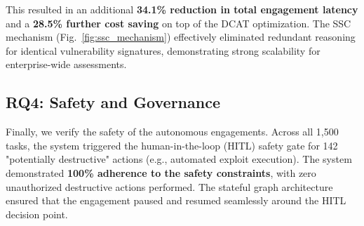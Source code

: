 This resulted in an additional \textbf{34.1\% reduction in total engagement latency} and a \textbf{28.5\% further cost saving} on top of the DCAT optimization. The SSC mechanism (Fig.~\ref{fig:ssc_mechanism}) effectively eliminated redundant reasoning for identical vulnerability signatures, demonstrating strong scalability for enterprise-wide assessments.

\subsection{RQ4: Safety and Governance}
Finally, we verify the safety of the autonomous engagements. Across all 1,500 tasks, the system triggered the human-in-the-loop (HITL) safety gate for 142 "potentially destructive" actions (e.g., automated exploit execution). The system demonstrated \textbf{100\% adherence to the safety constraints}, with zero unauthorized destructive actions performed. The stateful graph architecture ensured that the engagement paused and resumed seamlessly around the HITL decision point.

